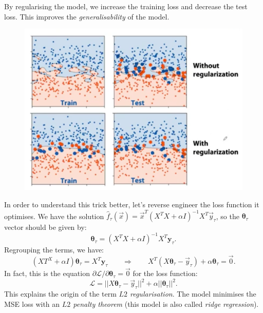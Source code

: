 \newpage
By regularising the model, we increase the training loss and decrease the test loss. This improves the \textit{generalisability} of the model.

\begin{figure}[H]
\centering
\includegraphics[scale=0.4]{generalisability.png}
\end{figure}

In order to understand this trick better, let's reverse engineer the loss function it optimises. We have the solution $\hat{f}_{\tau}(\vec{x}) = \vec{x}^T (X^T X + \alpha I)^{-1} X^T \vec{y}_{\tau}$, so the $\pmb{\theta}_{\tau}$ vector should be given by:
\begin{equation*}
\pmb{\theta}_{\tau} = (X^TX + \alpha I)^{-1} X^T \pmb{y}_{\tau}.
\end{equation*}
Regrouping the terms, we have:
\begin{equation*}
(XT^X + \alpha I)\pmb{\theta}_{\tau} = X^T \pmb{y}_{\tau} \qquad \Rightarrow \qquad X^T (X\pmb{\theta}_{\tau} - \vec{y}_{\tau}) + \alpha \pmb{\theta}_{\tau} = \vec{0}.
\end{equation*}
In fact, this is the equation $\partial \mathcal{L} / \partial \pmb{\theta}_{\tau} = \vec{0}$ for the loss function:
\begin{equation*}
\mathcal{L} = ||X\pmb{\theta}_{\tau} - \vec{y}_{\tau}||^2 + \alpha || \pmb{\theta}_{\tau}||^2.
\end{equation*}
This explains the origin of the term \textit{$L2$ regularisation}. The model minimises the MSE loss with an \textit{$L2$ penalty theorem} (this model is also called \textit{ridge regression}).\\

